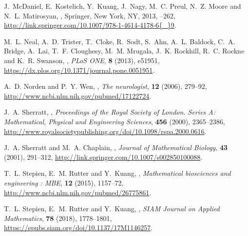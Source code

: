 \documentclass{aims}
\numberwithin{equation}{section}
\begin{document}
\begin{thebibliography}{10}
\newblock J.~McDaniel, E.~Kostelich, Y.~Kuang, J.~Nagy, M.~C. Preul, N.~Z.
  Moore and N.~L. Matirosyan,
,
\newblock Springer, New York, NY, 2013,
--262,
\newblock
  \urlprefix\url{http://link.springer.com/10.1007/978-1-4614-4178-6{\_}9}.

\newblock M.~L. Neal, A.~D. Trister, T.~Cloke, R.~Sodt, S.~Ahn, A.~L. Baldock,
  C.~A. Bridge, A.~Lai, T.~F. Cloughesy, M.~M. Mrugala, J.~K. Rockhill, R.~C.
  Rockne and K.~R. Swanson,
,
\newblock \emph{PLoS ONE}, \textbf{8} (2013), e51951,
\newblock \urlprefix\url{https://dx.plos.org/10.1371/journal.pone.0051951}.

\newblock A.~D. Norden and P.~Y. Wen,
,
\newblock \emph{The neurologist}, \textbf{12} (2006), 279--92,
\newblock \urlprefix\url{http://www.ncbi.nlm.nih.gov/pubmed/17122724}.

\newblock J.~A. Sherratt,
,
\newblock \emph{Proceedings of the Royal Society of London. Series A:
  Mathematical, Physical and Engineering Sciences}, \textbf{456} (2000),
  2365--2386,
\newblock
  \urlprefix\url{http://www.royalsocietypublishing.org/doi/10.1098/rspa.2000.0616}.

\newblock J.~A. Sherratt and M.~A. Chaplain,
,
\newblock \emph{Journal of Mathematical Biology}, \textbf{43} (2001), 291--312,
\newblock \urlprefix\url{http://link.springer.com/10.1007/s002850100088}.

\newblock T.~L. Stepien, E.~M. Rutter and Y.~Kuang,
,
\newblock \emph{Mathematical biosciences and engineering : MBE}, \textbf{12}
  (2015), 1157--72,
\newblock \urlprefix\url{http://www.ncbi.nlm.nih.gov/pubmed/26775861}.

\newblock T.~L. Stepien, E.~M. Rutter and Y.~Kuang,
,
\newblock \emph{SIAM Journal on Applied Mathematics}, \textbf{78} (2018),
  1778--1801,
\newblock \urlprefix\url{https://epubs.siam.org/doi/10.1137/17M1146257}.


\end{thebibliography}
\end{document}
